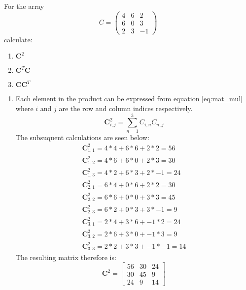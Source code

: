 For the array
\begin{equation*}
C=
\begin{pmatrix}
	4 & 6&2 \\6 &0&3\\2&3&-1
\end{pmatrix}
\end{equation*}
calculate:
\begin{enumerate}
	\item $\boldsymbol{C}^2$
	\item $\boldsymbol{C}^T\boldsymbol{C}$
	\item $\boldsymbol{C}\boldsymbol{C}^T$
\end{enumerate}
\begin{enumerate}
	\item Each element in the product can be expressed from equation \ref{eq:mat_mul} where $i$ and $j$ are the row and column indices respectively. 
	\begin{equation}
		\boldsymbol{C}^2_{i,j}=\sum_{n=1}^{3}C_{i,n}C_{n,j}
		\label{eq:mat_mul}
	\end{equation}
The subsuquent calculations are seen below:
	\begin{align*}
		\boldsymbol{C}^2_{1,1}=4*4+6*6+2*2 =56\\
		\boldsymbol{C}^2_{1,2}=4*6+6*0+2*3=30\\
		\boldsymbol{C}^2_{1,3}=4*2+6*3+2*-1=24\\
		\boldsymbol{C}^2_{2,1}=6*4+0*6+2*2=30\\
		\boldsymbol{C}^2_{2,2}=6*6+0*0+3*3=45\\
		\boldsymbol{C}^2_{2,3}=6*2+0*3+3*-1=9\\
		\boldsymbol{C}^2_{3,1}=2*4+3*6+-1*2=24\\
		\boldsymbol{C}^2_{3,2}=2*6+3*0+-1*3=9\\
		\boldsymbol{C}^2_{3,3}=2*2+3*3+-1*-1=14
	\end{align*}
The resulting matrix therefore is:
\begin{equation*}
\boxed{
\boldsymbol{C}^2=
\begin{bmatrix}
	56 &30&24\\30&45&9\\24&9&14
\end{bmatrix}}
\end{equation*}


\end{enumerate}
